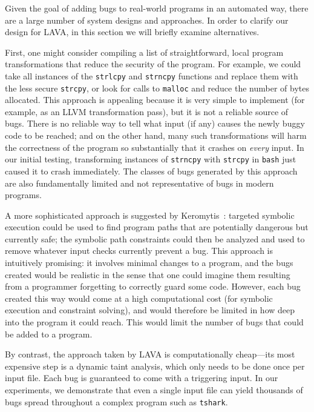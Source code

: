 Given the goal of adding bugs to real-world programs in an automated way, there are a large number of system designs and approaches.
In order to clarify our design for LAVA, in this section we will briefly examine alternatives.

First, one might consider compiling a list of straightforward, local program transformations that reduce the security of the program. 
For example, we could take all instances of the \texttt{strlcpy} and \texttt{strncpy} functions and replace them with the less secure \texttt{strcpy}, or look for calls to \texttt{malloc} and reduce the number of bytes allocated.
This approach is appealing because it is very simple to implement (for example, as an LLVM transformation pass), but it is not a reliable source of bugs.
There is no reliable way to tell what input (if any) causes the newly buggy code to be reached; and on the other hand, many such transformations will harm the correctness of the program so substantially that it crashes on \emph{every} input.
In our initial testing, transforming instances of \texttt{strncpy} with \texttt{strcpy} in \texttt{bash} just caused it to crash immediately.
The classes of bugs generated by this approach are also fundamentally limited and not representative of bugs in modern programs.

A more sophisticated approach is suggested by Keromytis~\cite{Keromytis:2015}: targeted symbolic execution could be used to find program paths that are potentially dangerous but currently safe; the symbolic path constraints could then be analyzed and used to remove whatever input checks currently prevent a bug. 
This approach is intuitively promising: it involves minimal changes to a program, and the bugs created would be realistic in the sense that one could imagine them resulting from a programmer forgetting to correctly guard some code. 
However, each bug created this way would come at a high computational cost (for symbolic execution and constraint solving), and would therefore be limited in how deep into the program it could reach. 
This would limit the number of bugs that could be added to a program.

By contrast, the approach taken by LAVA is computationally cheap---its most expensive step is a dynamic taint analysis, which only needs to be done once per input file. 
Each bug is guaranteed to come with a triggering input. 
In our experiments, we demonstrate that even a single input file can yield thousands of bugs spread throughout a complex program such as \texttt{tshark}.

